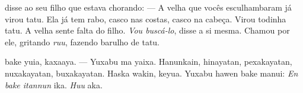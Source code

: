 
 disse ao seu
filho que estava chorando:\break
--- A velha que vocês esculhambaram
já virou tatu. Ela já tem rabo, casco
nas costas, casco na cabeça. Virou
todinha tatu. A velha sente falta
do filho.\break 
\textit{Vou buscá-lo}, disse a
si mesma. Chamou por ele, gritando
\textit{ruu}, fazendo barulho de tatu.

\vspace{2em}

 bake yuia, kaxaaya.\break
--- Yuxabu ma yaixa. Hanunkain, hinayatan,
pexakayatan, nuxakayatan, buxakayatan.\break
Haska wakin, keyua. Yuxabu hawen bake
manui:\break 
\emph{En bake itannun} ika. \emph{Huu} aka.

\vspace*{\fill}

